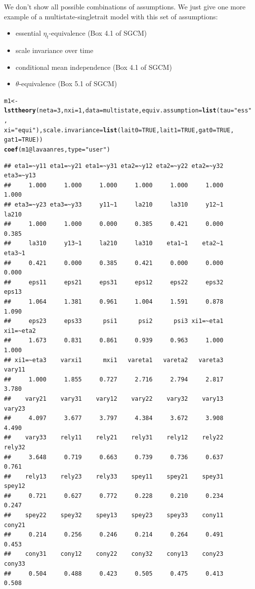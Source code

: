 \documentclass[10pt]{article}\usepackage{graphicx, color}
\makeatletter
\newcommand{\hlfunctioncall}[1]{\textcolor[rgb]{0.501960784313725,0,0.329411764705882}{\textbf{#1}}}%
\newcommand{\hlstring}[1]{\textcolor[rgb]{0.6,0.6,1}{#1}}%
\newenvironment{kframe}{%
 \def\at@end@of@kframe{}%
 \ifinner\ifhmode%
  \def\at@end@of@kframe{\end{minipage}}%
  \begin{minipage}{\columnwidth}%
 \fi\fi%
 \def\FrameCommand##1{\hskip\@totalleftmargin \hskip-\fboxsep
 \colorbox{shadecolor}{##1}\hskip-\fboxsep
     \hskip-\linewidth \hskip-\@totalleftmargin \hskip\columnwidth}%
 \MakeFramed {\advance\hsize-\width
   \@totalleftmargin\z@ \linewidth\hsize
   \@setminipage}}%
 {\par\unskip\endMakeFramed%
 \at@end@of@kframe}
\newenvironment{knitrout}{}{} %
\makeatother
\begin{document}
We don't show all possible combinations of assumptions. We just give one more example of a multistate-singletrait model with this set of assumptions:
%
\begin{itemize}
  \item essential $\eta_t$-equivalence (Box 4.1 of SGCM)
  \item scale invariance over time
  \item conditional mean independence (Box 4.1 of SGCM)
  \item $\theta$-equivalence (Box 5.1 of SGCM)
\end{itemize}
%
%
\begin{knitrout}
\color{fgcolor}\begin{kframe}
\begin{alltt}
m1 <- \hlfunctioncall{lsttheory}(neta = 3, nxi = 1, data = multistate, equiv.assumption = \hlfunctioncall{list}(tau = \hlstring{"ess"}, 
    xi = \hlstring{"equi"}), scale.invariance = \hlfunctioncall{list}(lait0 = TRUE, lait1 = TRUE, gat0 = TRUE, 
    gat1 = TRUE))
\hlfunctioncall{coef}(m1@lavaanres, type = \hlstring{"user"})
\end{alltt}
\begin{verbatim}
## eta1=~y11 eta1=~y21 eta1=~y31 eta2=~y12 eta2=~y22 eta2=~y32 eta3=~y13 
##     1.000     1.000     1.000     1.000     1.000     1.000     1.000 
## eta3=~y23 eta3=~y33     y11~1     la210     la310     y12~1     la210 
##     1.000     1.000     0.000     0.385     0.421     0.000     0.385 
##     la310     y13~1     la210     la310    eta1~1    eta2~1    eta3~1 
##     0.421     0.000     0.385     0.421     0.000     0.000     0.000 
##     eps11     eps21     eps31     eps12     eps22     eps32     eps13 
##     1.064     1.381     0.961     1.004     1.591     0.878     1.090 
##     eps23     eps33      psi1      psi2      psi3 xi1=~eta1 xi1=~eta2 
##     1.673     0.831     0.861     0.939     0.963     1.000     1.000 
## xi1=~eta3    varxi1      mxi1   vareta1   vareta2   vareta3    vary11 
##     1.000     1.855     0.727     2.716     2.794     2.817     3.780 
##    vary21    vary31    vary12    vary22    vary32    vary13    vary23 
##     4.097     3.677     3.797     4.384     3.672     3.908     4.490 
##    vary33    rely11    rely21    rely31    rely12    rely22    rely32 
##     3.648     0.719     0.663     0.739     0.736     0.637     0.761 
##    rely13    rely23    rely33    spey11    spey21    spey31    spey12 
##     0.721     0.627     0.772     0.228     0.210     0.234     0.247 
##    spey22    spey32    spey13    spey23    spey33    cony11    cony21 
##     0.214     0.256     0.246     0.214     0.264     0.491     0.453 
##    cony31    cony12    cony22    cony32    cony13    cony23    cony33 
##     0.504     0.488     0.423     0.505     0.475     0.413     0.508
\end{verbatim}
\end{kframe}
\end{knitrout}
\end{document}
